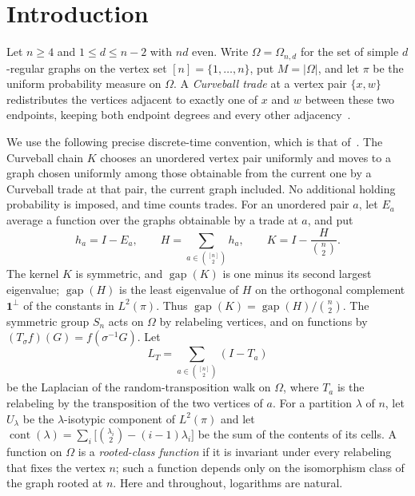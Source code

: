 \section{Introduction}\label{sec:introduction}
Let $n\ge4$ and $1\le d\le n-2$ with $nd$ even. Write $\Omega=\Omega_{n,d}$ for
the set of simple $d$-regular graphs on the vertex set $[n]=\{1,\ldots,n\}$, put
$M=|\Omega|$, and let $\pi$ be the uniform probability measure on $\Omega$. A
\emph{Curveball trade} at a vertex pair $\{x,w\}$ redistributes the vertices
adjacent to exactly one of $x$ and $w$ between these two endpoints, keeping
both endpoint degrees and every other adjacency~\cite{SNBFS14,CBS18}.

We use the following precise discrete-time convention, which is that
of~\cite{S26}. The Curveball chain $K$ chooses an unordered vertex pair
uniformly and moves to a graph chosen uniformly among those obtainable from
the current one by a Curveball trade at that pair, the current graph included.
No additional holding probability is imposed, and time counts trades. For an
unordered pair $a$, let $E_a$ average a function over the graphs obtainable by
a trade at $a$, and put
\begin{equation}\label{eq:operators}
 h_a=I-E_a,\qquad H=\sum_{a\in\binom{[n]}2}h_a,\qquad
 K=I-\frac{H}{\binom n2}.
\end{equation}
The kernel $K$ is symmetric, and $\operatorname{gap}(K)$ is one minus its
second largest eigenvalue; $\operatorname{gap}(H)$ is the least eigenvalue of
$H$ on the orthogonal complement $\mathbf1^\perp$ of the constants in
$L^2(\pi)$. Thus $\operatorname{gap}(K)=\operatorname{gap}(H)/\binom n2$. The
symmetric group $S_n$ acts on $\Omega$ by relabeling vertices, and on functions
by $(T_\sigma f)(G)=f(\sigma^{-1}G)$. Let
\[
 L_T=\sum_{a\in\binom{[n]}2}(I-T_a)
\]
be the Laplacian of the random-transposition walk on $\Omega$, where $T_a$ is
the relabeling by the transposition of the two vertices of $a$. For a
partition $\lambda$ of $n$, let $U_\lambda$ be the $\lambda$-isotypic component
of $L^2(\pi)$ and let
$\operatorname{cont}(\lambda)=\sum_i\bigl[\binom{\lambda_i}2-(i-1)\lambda_i\bigr]$
be the sum of the contents of its cells. A function on $\Omega$ is a
\emph{rooted-class function} if it is invariant under every relabeling that
fixes the vertex $n$; such a function depends only on the isomorphism class of
the graph rooted at $n$. Here and throughout, logarithms are natural.

